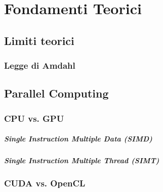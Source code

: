 \chapter{Fondamenti Teorici}
\label{ch:fondamenti}

\section{Limiti teorici}
\label{sec:limititeorici}

\lipsum[1]

\subsection{Legge di Amdahl}
\label{sec:amdahl}

\lipsum[1]

\section{Parallel Computing}
\label{sec:cpuvsgpu}

\subsection{CPU vs. GPU}
\label{subsec:cpuvsgpu}

\paragraph{Single Instruction Multiple Data (SIMD)}
\label{para:simd}

\paragraph{Single Instruction Multiple Thread (SIMT)}
\label{para:simt}

\lipsum[1]

\subsection{CUDA vs. OpenCL}
\label{subsec:cudavsopencl}

\lipsum[1]